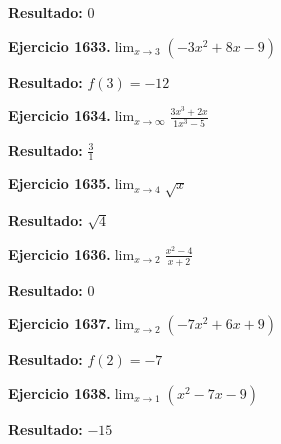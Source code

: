 \documentclass[10pt,a4paper]{article}
\begin{document}
\begin{solbox}
\textbf{Resultado:} \(\displaystyle 0\)
\end{solbox}

\newpage
\begin{ejbox}
\textbf{Ejercicio 1633.}\quad $\lim_{x\to 3} (-3x^2 +8x -9)$
\end{ejbox}

\begin{solbox}
\textbf{Resultado:} \(\displaystyle f(3) = -12\)
\end{solbox}

\begin{ejbox}
\textbf{Ejercicio 1634.}\quad $\lim_{x\to \infty} \frac{3x^3 + 2x}{1x^3 - 5}$
\end{ejbox}

\begin{solbox}
\textbf{Resultado:} \(\displaystyle \frac{3}{1}\)
\end{solbox}

\begin{ejbox}
\textbf{Ejercicio 1635.}\quad $\lim_{x\to 4} \sqrt{x}$
\end{ejbox}

\begin{solbox}
\textbf{Resultado:} \(\displaystyle \sqrt{4}\)
\end{solbox}

\newpage
\begin{ejbox}
\textbf{Ejercicio 1636.}\quad $\lim_{x\to 2} \frac{x^2-4}{x+2}$
\end{ejbox}

\begin{solbox}
\textbf{Resultado:} \(\displaystyle 0\)
\end{solbox}

\begin{ejbox}
\textbf{Ejercicio 1637.}\quad $\lim_{x\to 2} (-7x^2 +6x +9)$
\end{ejbox}

\begin{solbox}
\textbf{Resultado:} \(\displaystyle f(2) = -7\)
\end{solbox}

\begin{ejbox}
\textbf{Ejercicio 1638.}\quad $\lim_{x\to 1} (x^2 -7x -9)$
\end{ejbox}

\begin{solbox}
\textbf{Resultado:} \(\displaystyle -15\)
\end{solbox}
\end{document}
